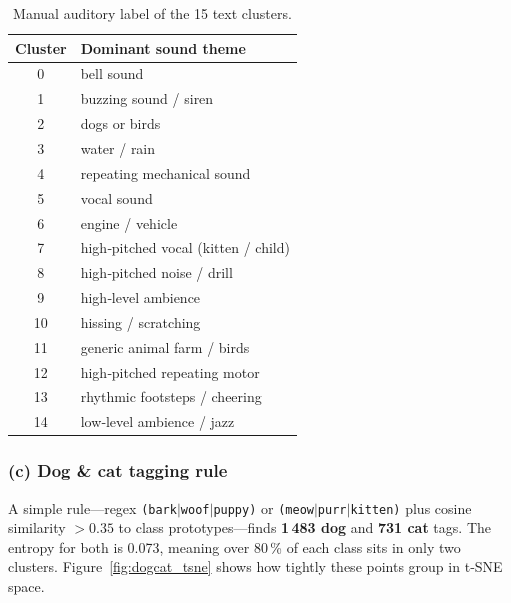 \documentclass{article}
\begin{document}
\begin{table}[h]
  \caption{Manual auditory label of the 15 text clusters.}
  \label{tab:text_themes}
  \centering
  \small
  \begin{tabular}{cl}
    \toprule
    Cluster & Dominant sound theme \\ \midrule
    0 & bell sound \\
    1 & buzzing sound / siren \\
    2 & dogs or birds \\
    3 & water / rain \\
    4 & repeating mechanical sound \\
    5 & vocal sound \\
    6 & engine / vehicle \\
    7 & high‑pitched vocal (kitten / child) \\
    8 & high‑pitched noise / drill \\
    9 & high‑level ambience \\
    10 & hissing / scratching \\
    11 & generic animal farm / birds \\
    12 & high‑pitched repeating motor \\
    13 & rhythmic footsteps / cheering \\
    14 & low‑level ambience / jazz \\
    \bottomrule
  \end{tabular}
\end{table}

\subsubsection{(c) Dog \& cat tagging rule}
A simple rule—regex \texttt{(bark$|$woof$|$puppy)} or \texttt{(meow$|$purr$|$kitten)} plus cosine similarity $>0.35$ to class prototypes—finds \textbf{1\,483 dog} and \textbf{731 cat} tags. The entropy for both is 0.073, meaning over 80\,\% of each class sits in only two clusters. Figure~\ref{fig:dogcat_tsne} shows how tightly these points group in t‑SNE space.
\end{document}
